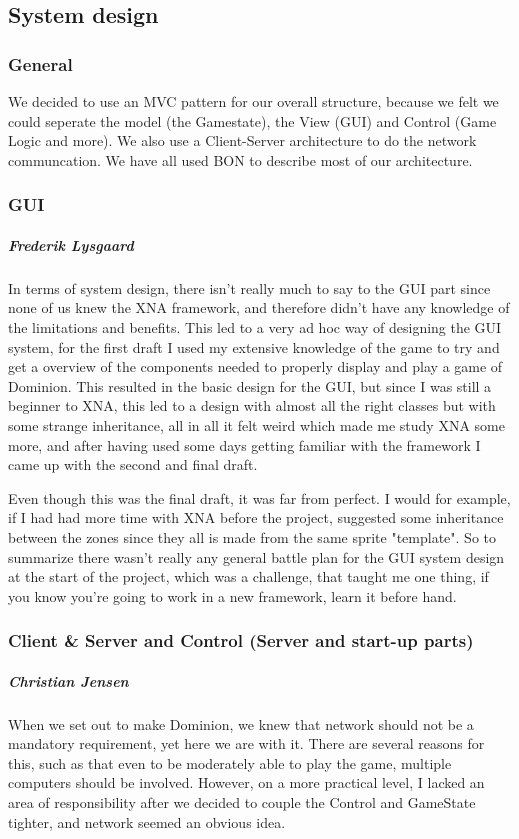 \subsection{System design}
\subsubsection{General}
We decided to use an MVC pattern for our overall structure, because we felt we could seperate the model (the Gamestate), the View (GUI) and Control (Game Logic and more). We also use a Client-Server architecture to do the network communcation. We have all used BON to describe most of our architecture.

\subsubsection{GUI}
\subparagraph{Frederik Lysgaard}
In terms of system design, there isn't really much to say to the GUI part since none of us knew the XNA framework, and therefore didn't have any knowledge of the limitations and benefits.
This led to a very ad hoc way of designing the GUI system, for the first draft I used my extensive knowledge of the game to try and get a overview of the components needed to properly display and play a game of Dominion. 
This resulted in the basic design for the GUI, but since I was still a beginner to XNA, this led to a design with almost all the right classes but with some strange inheritance, all in all it felt weird which made me study XNA some more, and after having used some days getting familiar with the framework I came up with the second and final draft.

Even though this was the final draft, it was far from perfect. I would for example, if I had had more time with XNA before the project, suggested some inheritance between the zones since they all is made from the same sprite "template". So to summarize there wasn't really any general battle plan for the GUI system design at the start of the project, which was a challenge, that taught me one thing, if you know you're going to work in a new framework, learn it before hand.

\subsubsection{Client \& Server and Control (Server and start-up parts)}
\subparagraph{Christian Jensen}
When we set out to make Dominion, we knew that network should not be a mandatory requirement, yet here we are with it.
There are several reasons for this, such as that even to be moderately able to play the game, multiple computers should be involved.
However, on a more practical level, I lacked an area of responsibility after we decided to couple the Control and GameState tighter, and network seemed an obvious idea.

